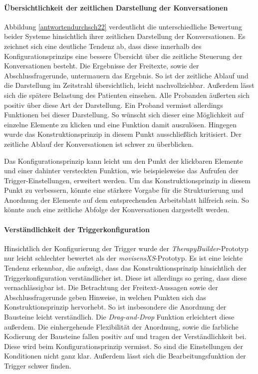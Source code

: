 \paragraph{Übersichtlichkeit der zeitlichen Darstellung der Konversationen}
Abbildung \ref{antwortendurchsch22} verdeutlicht die unterschiedliche Bewertung beider Systeme hinsichtlich ihrer zeitlichen Darstellung der Konversationen. Es zeichnet sich eine deutliche Tendenz ab, dass diese innerhalb des Konfigurationsprinzips eine bessere Übersicht über die zeitliche Steuerung der Konversationen besteht. Die Ergebnisse der Freitexte, sowie der Abschlussfragerunde, untermauern das Ergebnis. So ist der zeitliche Ablauf und die Darstellung im Zeitstrahl übersichtlich, leicht nachvollziehbar. Außerdem lässt sich die spätere Belastung des Patienten einsehen. Alle Probanden äußerten sich positiv über diese Art der Darstellung. Ein Proband vermisst allerdings Funktionen bei dieser Darstellung. So wünscht sich dieser eine Möglichkeit auf einzelne Elemente zu klicken und eine Funktion damit auszulösen. Hingegen wurde das Konstruktionsprinzip in diesem Punkt ausschließlich kritisiert. Der zeitliche Ablauf der Konversationen ist schwer zu überblicken. 

Das Konfigurationsprinzip kann leicht um den Punkt der klickbaren Elemente und einer dahinter versteckten Funktion, wie beispielsweise das Aufrufen der Trigger-Einstellungen, erweitert werden. Um das Konstruktionsprinzip in diesem Punkt zu verbessern, könnte eine stärkere Vorgabe für die Strukturierung und Anordnung der Elemente auf dem entsprechenden Arbeitsblatt hilfreich sein. So könnte auch eine zeitliche Abfolge der Konversationen dargestellt werden.


\paragraph{Verständlichkeit der Triggerkonfiguration}
Hinsichtlich der Konfigurierung der Trigger wurde der \emph{TherapyBuilder}-Prototyp nur leicht schlechter bewertet als der \emph{movisensXS}-Prototyp. Es ist eine leichte Tendenz erkennbar, die aufzeigt, dass das Konstruktionsprinzip hinsichtlich der Triggerkonfiguration verständlicher ist. Diese ist allerdings so gering, dass diese vernachlässigbar ist. Die Betrachtung der Freitext-Aussagen sowie der Abschlussfragerunde geben Hinweise, in welchen Punkten sich das Konstruktionsprinzip hervorhebt. So ist insbesondere die Anordnung der Bausteine leicht verständlich. Die \emph{Drag-and-Drop} Funktion erleichtert diese außerdem. Die einhergehende Flexibilität der Anordnung, sowie die farbliche Kodierung der Bausteine fallen positiv auf und tragen der Verständlichkeit bei. Diese wird beim Konfigurationsprinzip vermisst. So sind die Einstellungen der Konditionen nicht ganz klar. Außerdem lässt sich die Bearbeitungsfunktion der Trigger schwer finden. 

